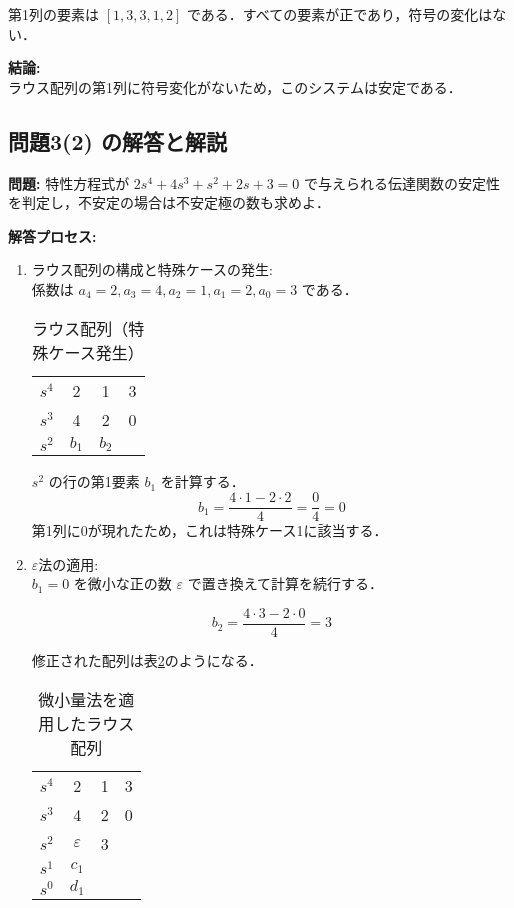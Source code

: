\documentclass[11pt,a4paper]{ltjsarticle}
\begin{document}
\begin{enumerate}
第1列の要素は $[1, 3, 3, 1, 2]$ である．すべての要素が正であり，符号の変化はない．
\end{enumerate}

\textbf{結論:}\\
ラウス配列の第1列に符号変化がないため，このシステムは安定である．

\subsection{問題3(2) の解答と解説}

\textbf{問題:} 特性方程式が $2s^4+4s^3+s^2+2s+3=0$ で与えられる伝達関数の安定性を判定し，不安定の場合は不安定極の数も求めよ．

\textbf{解答プロセス:}

\begin{enumerate}
\item ラウス配列の構成と特殊ケースの発生:\\
係数は $a_4=2, a_3=4, a_2=1, a_1=2, a_0=3$ である．

\begin{table}[ht]
\centering
\caption{ラウス配列（特殊ケース発生）}
\label{tbl:routh2}
\begin{tabular}{cccc}
\toprule
$s^4$ & 2 & 1 & 3 \\
$s^3$ & 4 & 2 & 0 \\
$s^2$ & $b_1$ & $b_2$ & \\
\bottomrule
\end{tabular}
\end{table}

$s^2$ の行の第1要素 $b_1$ を計算する．
$$b_1 = \frac{4 \cdot 1 - 2 \cdot 2}{4} = \frac{0}{4} = 0$$
第1列に0が現れたため，これは特殊ケース1に該当する．

\item $\varepsilon$法の適用:\\
$b_1=0$ を微小な正の数 $\varepsilon$ で置き換えて計算を続行する．

$$b_2 = \frac{4 \cdot 3 - 2 \cdot 0}{4} = 3$$

修正された配列は表\ref{tbl:routh2_epsilon}のようになる．

\begin{table}[ht]
\centering
\caption{微小量法を適用したラウス配列}
\label{tbl:routh2_epsilon}
\begin{tabular}{cccc}
\toprule
$s^4$ & 2 & 1 & 3 \\
$s^3$ & 4 & 2 & 0 \\
$s^2$ & $\varepsilon$ & 3 & \\
$s^1$ & $c_1$ & & \\
$s^0$ & $d_1$ & & \\
\bottomrule
\end{tabular}
\end{table}


\end{enumerate}
\end{document}
